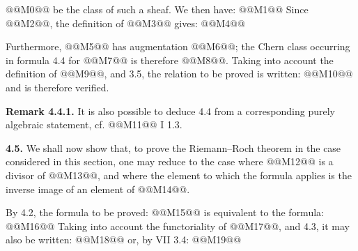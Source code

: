 @@M0@@ be the class of such a sheaf. We then have:
@@M1@@
Since @@M2@@, the definition of @@M3@@ gives:
@@M4@@

Furthermore, @@M5@@ has augmentation @@M6@@; the Chern class occurring in formula 4.4 for @@M7@@ is therefore @@M8@@. Taking into account the definition of @@M9@@, and 3.5, the relation to be proved is written:
@@M10@@
and is therefore verified.

\textbf{Remark 4.4.1.} It is also possible to deduce 4.4 from a corresponding purely algebraic statement, cf. @@M11@@ I 1.3.

\textbf{4.5.} We shall now show that, to prove the Riemann--Roch theorem in the case considered in this section, one may reduce to the case where @@M12@@ is a divisor of @@M13@@, and where the element to which the formula applies is the inverse image of an element of @@M14@@.

By 4.2, the formula to be proved:
@@M15@@
is equivalent to the formula:
@@M16@@
Taking into account the functoriality of @@M17@@, and 4.3, it may also be written:
@@M18@@
or, by VII 3.4:
@@M19@@
